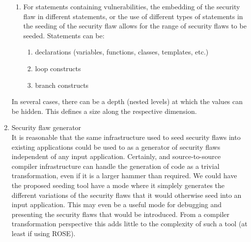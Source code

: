 \begin{enumerate}
\begin{enumerate}
            \item For statements containing vulnerabilities, the embedding of 
                  the security flaw in different statements, or the use of different
                  types of statements in the seeding of the security flaw allows
                  for the range of security flaws to be seeded. Statements 
                  can be:
               \begin{enumerate}
                  \item declarations (variables, functions, classes, templates, etc.)
                  \item loop constructs
                  \item branch constructs
               \end{enumerate}

         \end{enumerate}
         In several cases, there can be a depth (nested levels) at which the 
         values can be hidden.  This defines a size along the respective
         dimension.

   \item Security flaw generator \\
         It is reasonable that the same infrastructure used to seed security flaws into
         existing applications could be used to as a generator of security flaws
         independent of any input application.
         Certainly, and source-to-source compiler infrastructure can handle the generation
         of code as a trivial transformation, even if it is a larger hammer than required.
         We could have the proposed seeding tool have a mode where it simplely generates
         the different variations of the security flaws that it would otherwise seed into
         an input application.  This may even be a useful mode for debugging and
         presenting the security flaws that would be introduced.  From a compiler
         transformation perspective this adds little to the complexity of such a tool
         (at least if using ROSE).


\end{enumerate}

